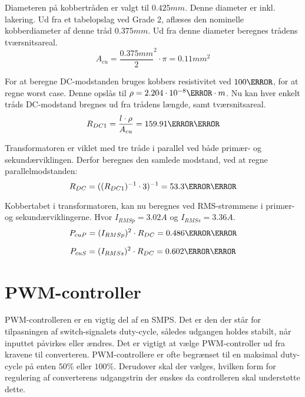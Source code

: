 Diameteren på kobbertråden er valgt til $0.425mm$. Denne diameter er inkl. lakering. Ud fra et tabelopslag ved Grade 2\cite{wire-diameter}, aflæses den nominelle kobberdiameter af denne tråd $0.375mm$.
Ud fra denne diameter beregnes trådens tværsnitsareal.
\begin{equation} \label{kobber-areal}
A_{cu} = \frac{0.375mm}{2}^2 \cdot \pi = 0.11mm^2
\end{equation}

For at beregne DC-modstanden bruges kobbers resistivitet ved $100\degreeCelsius$, for at regne worst case. Denne opslås til $\rho=2.204\cdot 10^{-8}\ohm \cdot m$. Nu kan hver enkelt tråds DC-modstand bregnes ud fra trådens længde, samt tværsnitsareal.
\begin{equation} \label{dc1-modstand}
R_{DC1} = \frac{l \cdot \rho}{A_{cu}} = 159.91\milli\ohm
\end{equation}

Transformatoren er viklet med tre tråde i parallel ved både primær- og sekundærviklingen. Derfor beregnes den samlede modstand, ved at regne parallelmodstanden:
\begin{equation} \label{dc-modstand}
R_{DC} = ((R_{DC1})^{-1} \cdot 3)^{-1} = 53.3\milli\ohm
\end{equation}

Kobbertabet i transformatoren, kan nu beregnes ved RMS-strømmene i primær- og sekundærviklingerne. Hvor $I_{RMSp} = 3.02A$ og $I_{RMSs} = 3.36A$.
\begin{equation} \label{dc-tab-pri}
P_{cuP} = (I_{RMSp})^2 \cdot R_{DC} = 0.486\milli\watt
\end{equation}

\begin{equation} \label{dc-tab-sek}
P_{cuS} = (I_{RMSs})^2 \cdot R_{DC} = 0.602\milli\watt
\end{equation}



\section{PWM-controller}
PWM-controlleren er en vigtig del af en SMPS. Det er den der står for tilpasningen af switch-signalets duty-cycle, således udgangen holdes stabilt, når inputtet påvirkes eller ændres. Det er vigtigt at vælge PWM-controller ud fra kravene til converteren. PWM-controllere er ofte begrænset til en maksimal duty-cycle på enten $50\percent$ eller $100\percent$. Derudover skal der vælges, hvilken form for regulering af converterens udgangstrin der ønskes da controlleren skal understøtte dette. 

